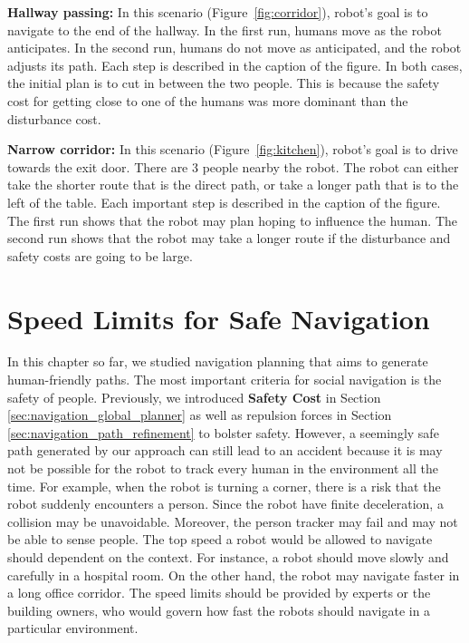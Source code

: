 \textbf{Hallway passing: } In this scenario (Figure~\ref{fig:corridor}), robot's goal is to navigate to the end of the hallway. In the first run, humans move as the robot anticipates. In the second run, humans do not move as anticipated, and the robot adjusts its path. Each step is described in the caption of the figure. In both cases, the initial plan is to cut in between the two people. This is because the safety cost for getting close to one of the humans was more dominant than the disturbance cost.

\textbf{Narrow corridor:} In this scenario (Figure~\ref{fig:kitchen}), robot's goal is to drive towards the exit door. There are 3 people nearby the robot. The robot can either take the shorter route that is the direct path, or take a longer path that is to the left of the table. Each important step is described in the caption of the figure. The first run shows that the robot may plan hoping to influence the human. The second run shows that the robot may take a longer route if the disturbance and safety costs are going to be large.



\section{Speed Limits for Safe Navigation}
\label{sec:navigation_speed_limits}

In this chapter so far, we studied navigation planning that aims to generate human-friendly paths. The most important criteria for social navigation is the safety of people. Previously, we introduced \textbf{Safety Cost} in Section \ref{sec:navigation_global_planner} as well as repulsion forces in Section \ref{sec:navigation_path_refinement} to bolster safety. However, a seemingly safe path generated by our approach can still lead to an accident because it is may not be possible for the robot to track every human in the environment all the time. For example, when the robot is turning a corner, there is a risk that the robot suddenly encounters a person. Since the robot have finite deceleration, a collision may be unavoidable. Moreover, the person tracker may fail and may not be able to sense people. The top speed a robot would be allowed to navigate should dependent on the context. For instance, a robot should move slowly and carefully in a hospital room. On the other hand, the robot may navigate faster in a long office corridor. The speed limits should be provided by experts or the building owners, who would govern how fast the robots should navigate in a particular environment.

